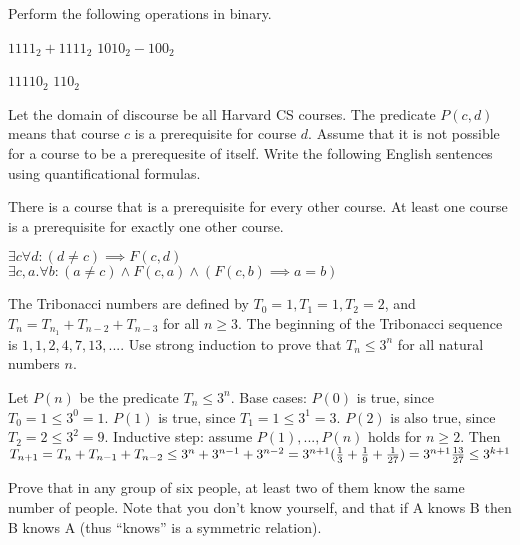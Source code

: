 \documentclass[solution, letterpaper]{cs20exam}
\begin{document}
\problem{}{} Perform the following operations in binary.

\subproblem $1111_2 + 1111_2$
\subproblem $1010_2 - 100_2$

\begin{solution}
\subsolution $11110_2$
\subsolution $110_2$
\end{solution}

\problem{}{} Let the domain of discourse be all Harvard CS courses. The predicate $P(c, d)$ means that course $c$ is a prerequisite for course $d$. Assume that it is not possible for a course to be a prerequesite of itself. Write the following English sentences using quantificational formulas.

\subproblem There is a course that is a prerequisite for every other course.
\subproblem At least one course is a prerequisite for exactly one other course.

\begin{solution}
\subsolution $\exists c \forall d: (d \neq c) \implies F(c,d)$
\subsolution $\exists c, a . \forall b : (a \neq c) \land F(c, a) \land (F(c, b) \implies a = b)$

\end{solution}

\problem{}{} The Tribonacci numbers are defined by $T_0 = 1, T_1 = 1, T_2 = 2$, and $T_n = T_{n_1} + T_{n-2} + T_{n-3}$ for all $n \ge 3$. The beginning of the Tribonacci sequence is $1, 1, 2, 4, 7, 13, ...$. Use strong induction to prove that $T_n \le 3^n$ for all natural numbers $n$.

\begin{solution}
Let $P(n)$ be the predicate $T_n \le 3^n$. Base cases: $P(0)$ is true, since $T_0 = 1 \le 3^0 = 1$. $P(1)$ is true, since $T_1 = 1 \le 3^1 = 3$. $P(2)$ is also true, since $T_2 = 2 \le 3^2 = 9$. Inductive step: assume $P(1), ..., P(n)$ holds for $n \ge 2$. Then 
\begin{math}
T_{n+1} = T_n + T_{n-1} + T_{n-2}
\\ \le 3^n + 3^{n-1} + 3^{n-2}
\\ = 3^{n+1}(\frac{1}{3} + \frac{1}{9} + \frac{1}{27})
\\ = 3^{n+1}\frac{13}{27}
\\ \le 3^{k+1}
\end{math}
\end{solution}


\problem{}{}

Prove that in any group of six people, at least two of them know the same number of people. Note that you don't know yourself, and that if A knows B then B knows A (thus ``knows'' is a symmetric relation). 
\end{document}

